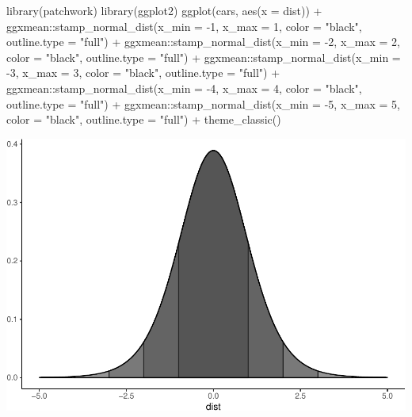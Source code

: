 \documentclass[12pt]{article}
\newenvironment{Shaded}{\begin{snugshade}}{\end{snugshade}}
\newcommand{\AttributeTok}[1]{\textcolor[rgb]{0.77,0.63,0.00}{#1}}
\newcommand{\DecValTok}[1]{\textcolor[rgb]{0.00,0.00,0.81}{#1}}
\newcommand{\FunctionTok}[1]{\textcolor[rgb]{0.00,0.00,0.00}{#1}}
\newcommand{\NormalTok}[1]{#1}
\newcommand{\SpecialCharTok}[1]{\textcolor[rgb]{0.00,0.00,0.00}{#1}}
\newcommand{\StringTok}[1]{\textcolor[rgb]{0.31,0.60,0.02}{#1}}
\begin{document}
\begin{Shaded}
\begin{Highlighting}[]
\FunctionTok{library}\NormalTok{(patchwork)}
\FunctionTok{library}\NormalTok{(ggplot2)}
\FunctionTok{ggplot}\NormalTok{(cars, }\FunctionTok{aes}\NormalTok{(}\AttributeTok{x =}\NormalTok{ dist)) }\SpecialCharTok{+}
\NormalTok{  ggxmean}\SpecialCharTok{::}\FunctionTok{stamp\_normal\_dist}\NormalTok{(}\AttributeTok{x\_min =} \SpecialCharTok{{-}}\DecValTok{1}\NormalTok{, }\AttributeTok{x\_max =} \DecValTok{1}\NormalTok{, }\AttributeTok{color =} \StringTok{"black"}\NormalTok{, }\AttributeTok{outline.type =} \StringTok{"full"}\NormalTok{) }\SpecialCharTok{+}
\NormalTok{  ggxmean}\SpecialCharTok{::}\FunctionTok{stamp\_normal\_dist}\NormalTok{(}\AttributeTok{x\_min =} \SpecialCharTok{{-}}\DecValTok{2}\NormalTok{, }\AttributeTok{x\_max =} \DecValTok{2}\NormalTok{, }\AttributeTok{color =} \StringTok{"black"}\NormalTok{, }\AttributeTok{outline.type =} \StringTok{"full"}\NormalTok{) }\SpecialCharTok{+}
\NormalTok{  ggxmean}\SpecialCharTok{::}\FunctionTok{stamp\_normal\_dist}\NormalTok{(}\AttributeTok{x\_min =} \SpecialCharTok{{-}}\DecValTok{3}\NormalTok{, }\AttributeTok{x\_max =} \DecValTok{3}\NormalTok{, }\AttributeTok{color =} \StringTok{"black"}\NormalTok{, }\AttributeTok{outline.type =} \StringTok{"full"}\NormalTok{) }\SpecialCharTok{+}
\NormalTok{  ggxmean}\SpecialCharTok{::}\FunctionTok{stamp\_normal\_dist}\NormalTok{(}\AttributeTok{x\_min =} \SpecialCharTok{{-}}\DecValTok{4}\NormalTok{, }\AttributeTok{x\_max =} \DecValTok{4}\NormalTok{, }\AttributeTok{color =} \StringTok{"black"}\NormalTok{, }\AttributeTok{outline.type =} \StringTok{"full"}\NormalTok{) }\SpecialCharTok{+}
\NormalTok{  ggxmean}\SpecialCharTok{::}\FunctionTok{stamp\_normal\_dist}\NormalTok{(}\AttributeTok{x\_min =} \SpecialCharTok{{-}}\DecValTok{5}\NormalTok{, }\AttributeTok{x\_max =} \DecValTok{5}\NormalTok{, }\AttributeTok{color =} \StringTok{"black"}\NormalTok{, }\AttributeTok{outline.type =} \StringTok{"full"}\NormalTok{) }\SpecialCharTok{+}
  \FunctionTok{theme\_classic}\NormalTok{()}
\end{Highlighting}
\end{Shaded}

\begin{center}\includegraphics[width=0.5\linewidth]{skeleton_files/figure-latex/unnamed-chunk-9-1} \end{center}
\end{document}
